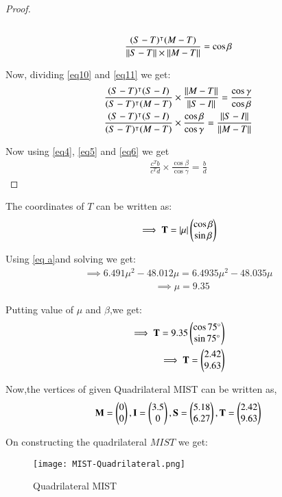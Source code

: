 \documentclass[journal,12pt,twocolumn]{IEEEtran}
\begin{document}
\begin{enumerate}
\begin{proof}
\begin{align}
\\
\frac{(S-T)^\intercal(M-T)}{\Vert S-T\rVert\times\Vert M-T\rVert}=\cos \beta \label{eq11}
\end{align}
\item Now, dividing \eqref{eq10} and \eqref{eq11} we get:
\begin{align}
\frac{(S-T)^\intercal(S-I)}{(S-T)^\intercal(M-T)} \times \frac{\Vert M-T\rVert}{\Vert S-I\rVert}=\frac{\cos \gamma}{\cos \beta} 
\\
\frac{(S-T)^\intercal(S-I)}{(S-T)^\intercal(M-T)} \times \frac{\cos \beta}{\cos \gamma}= \frac{\Vert S-I\rVert}{\Vert M-T\rVert}
\end{align}
\item Now using \eqref{eq4}, \eqref{eq5} and \eqref{eq6} we get
\begin{align}
\frac{c^Tb}{c^T d} \times \frac{\cos \beta}{\cos \gamma} =\frac{b}{d} \label{eq a}
\end{align}
\end{proof}
\begin{lemma}
The coordinates of $T$ can be written as:
\begin{align}
\implies \mathbf{T}=\vert\mu\vert \begin{pmatrix}\cos \beta\\\sin \beta \end{pmatrix}
\end{align}
\end{lemma}
\item Using \eqref{eq a}and solving we get:
\begin{align}
\implies 6.491 \mu^2 -48.012\mu =6.4935\mu^2-48.035\mu
\end{align}
\begin{align}
&\implies \mu=9.35
\end{align}
\item Putting value of $\mu$  and $\beta$,we get:
\begin{align}
\implies \mathbf{T} =9.35\begin{pmatrix}\cos 75 \degree\\\sin 75 \degree\end{pmatrix} 
\\
\implies \mathbf{T}=\begin{pmatrix}2.42\\9.63\end{pmatrix} 
\end{align}
   \item Now,the vertices of given Quadrilateral MIST can be written as,
\begin{align}
 \mathbf{M}=\begin{pmatrix}0\\0\end{pmatrix},\mathbf{I} = \begin{pmatrix}3.5\\0\end{pmatrix}, \mathbf{S}=\begin{pmatrix}5.18\\6.27\end{pmatrix},\mathbf{T}=\begin{pmatrix}2.42\\9.63\end{pmatrix}
\end{align}
    \item On constructing the quadrilateral $MIST$ we get:
\end{enumerate}


\begin{figure}[!ht]
\centering
\texttt{[image: MIST-Quadrilateral.png]}
\caption{Quadrilateral MIST}
\label{fig:Quadrilateral MIST}	
\end{figure}
\end{document}
